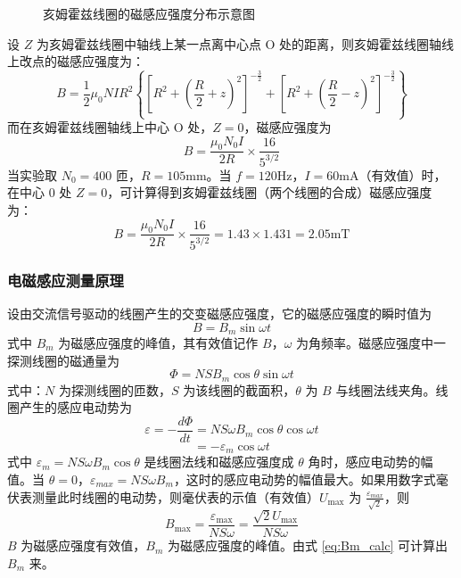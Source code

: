 \documentclass[11pt]{article}
\begin{document}
\begin{figure}[htbp]
    \centering
    \caption{亥姆霍兹线圈的磁感应强度分布示意图}
    \label{fig:helmholtz_coil}
\end{figure}

设 $Z$ 为亥姆霍兹线圈中轴线上某一点离中心点 O 处的距离，则亥姆霍兹线圈轴线上改点的磁感应强度为：
\begin{equation}
    B = \frac{1}{2} \mu_0 N I R^2 \left\{ \left[ R^2 + \left(\frac{R}{2} + z\right)^2 \right]^{-\frac{3}{2}} + \left[ R^2 + \left(\frac{R}{2} - z\right)^2 \right]^{-\frac{3}{2}} \right\} \label{eq:helmholtz_B_z}
\end{equation}
而在亥姆霍兹线圈轴线上中心 O 处，$Z=0$，磁感应强度为
\begin{equation}
    B = \frac{\mu_0 N_0 I}{2R} \times \frac{16}{5^{3/2}} \label{eq:helmholtz_B_0}
\end{equation}
当实验取 $N_0=400$ 匝，$R=105\text{mm}$。当 $f=120\text{Hz}$，$I=60\text{mA}$（有效值）时，在中心 0 处 $Z=0$，可计算得到亥姆霍兹线圈（两个线圈的合成）磁感应强度为：
\[
B = \frac{\mu_0 N_0 I}{2R} \times \frac{16}{5^{3/2}} = 1.43 \times 1.431 = 2.05\text{mT}
\]

\subsubsection{电磁感应测量原理}

设由交流信号驱动的线圈产生的交变磁感应强度，它的磁感应强度的瞬时值为
\[
B = B_m \sin \omega t
\]
式中 $B_m$ 为磁感应强度的峰值，其有效值记作 $B$，$\omega$ 为角频率。磁感应强度中一探测线圈的磁通量为
\[
\Phi = N S B_m \cos \theta \sin \omega t
\]
式中：$N$ 为探测线圈的匝数，$S$ 为该线圈的截面积，$\theta$ 为 $B$ 与线圈法线夹角。线圈产生的感应电动势为
\[
\varepsilon = - \frac{d\Phi}{dt} = N S \omega B_m \cos \theta \cos \omega t
\]
\[
= - \varepsilon_m \cos \omega t
\]
式中 $\varepsilon_m = N S \omega B_m \cos \theta$ 是线圈法线和磁感应强度成 $\theta$ 角时，感应电动势的幅值。当 $\theta = 0$，$\varepsilon_{max} = N S \omega B_m$，这时的感应电动势的幅值最大。如果用数字式毫伏表测量此时线圈的电动势，则毫伏表的示值（有效值）$U_{\max}$ 为 $\frac{\varepsilon_{max}}{\sqrt{2}}$，则
\begin{equation}
    B_{\max} = \frac{\varepsilon_{\max}}{NS\omega} = \frac{\sqrt{2} U_{\max}}{NS\omega} \label{eq:Bm_calc}
\end{equation}
$B$ 为磁感应强度有效值，$B_m$ 为磁感应强度的峰值。由式 \eqref{eq:Bm_calc} 可计算出 $B_m$ 来。
\end{document}
